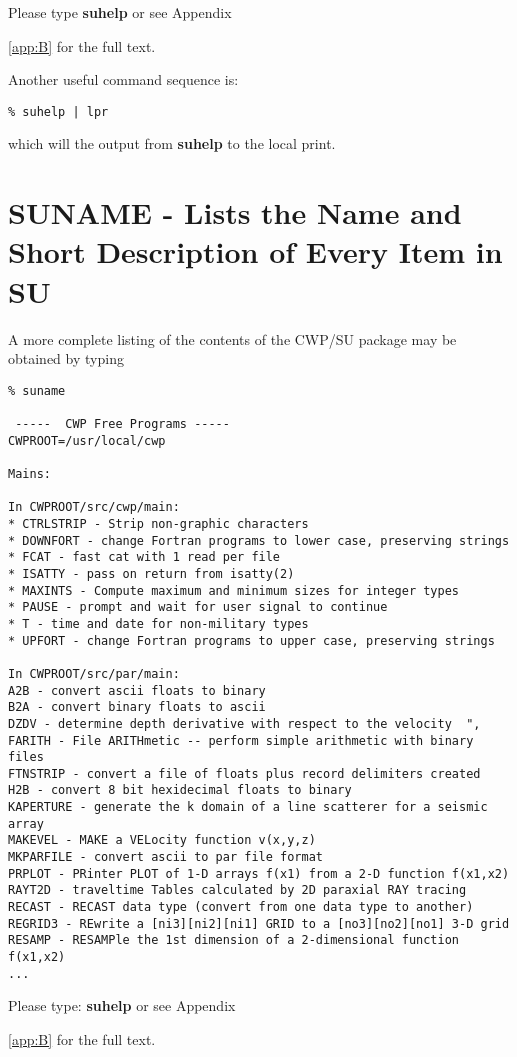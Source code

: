 Please type {\bf suhelp\/} or see Appendix~{\ref{app:B} for the full text.

Another useful command sequence is:
\begin{verbatim}
% suhelp | lpr
\end{verbatim} \noindent
which will the output from {\bf suhelp\/} to the local print.


\section{SUNAME - Lists the Name and Short Description of Every Item in SU}

A more complete listing of the contents of the CWP/SU package
may be obtained by typing
{\small\begin{verbatim}
% suname

 -----  CWP Free Programs -----   
CWPROOT=/usr/local/cwp

Mains: 

In CWPROOT/src/cwp/main:
* CTRLSTRIP - Strip non-graphic characters
* DOWNFORT - change Fortran programs to lower case, preserving strings
* FCAT - fast cat with 1 read per file 
* ISATTY - pass on return from isatty(2)
* MAXINTS - Compute maximum and minimum sizes for integer types 
* PAUSE - prompt and wait for user signal to continue
* T - time and date for non-military types
* UPFORT - change Fortran programs to upper case, preserving strings

In CWPROOT/src/par/main:
A2B - convert ascii floats to binary 				
B2A - convert binary floats to ascii				
DZDV - determine depth derivative with respect to the velocity	",  
FARITH - File ARITHmetic -- perform simple arithmetic with binary files
FTNSTRIP - convert a file of floats plus record delimiters created 	
H2B - convert 8 bit hexidecimal floats to binary		
KAPERTURE - generate the k domain of a line scatterer for a seismic array
MAKEVEL - MAKE a VELocity function v(x,y,z)				
MKPARFILE - convert ascii to par file format 				
PRPLOT - PRinter PLOT of 1-D arrays f(x1) from a 2-D function f(x1,x2)
RAYT2D - traveltime Tables calculated by 2D paraxial RAY tracing	
RECAST - RECAST data type (convert from one data type to another)	
REGRID3 - REwrite a [ni3][ni2][ni1] GRID to a [no3][no2][no1] 3-D grid
RESAMP - RESAMPle the 1st dimension of a 2-dimensional function f(x1,x2)
...
\end{verbatim}}\noindent

Please type: {\bf suhelp\/} or see Appendix~{\ref{app:B} for the full text.


}}

